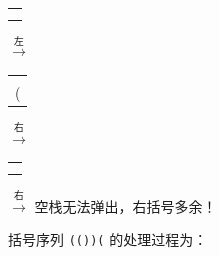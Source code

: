 \begin{table}[H]
	\centering
	\begin{tabular}{|c|}
		\phantom{(}
		\\\hline
		\\\hline
		\\\hline
	\end{tabular}
	$\stackrel{\text{左}}{\longrightarrow}$
	\begin{tabular}{|c|}
		\phantom{(}
		\\\hline
		\\\hline
		(
		\\\hline
	\end{tabular}
	$\stackrel{\text{右}}{\longrightarrow}$
	\begin{tabular}{|c|}
		\phantom{(}
		\\\hline
		\\\hline
		\\\hline
	\end{tabular}
	$\stackrel{\text{右}}{\longrightarrow}$
	空栈无法弹出，右括号多余！
\end{table}

括号序列 \lstinline{(())(} 的处理过程为：

